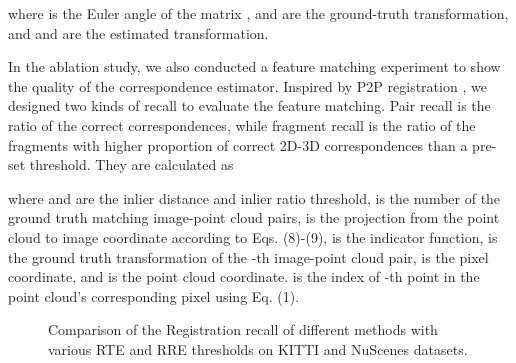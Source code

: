 \documentclass[lettersize,journal]{IEEEtran}
\begin{document}
where  is the Euler angle of the matrix ,  and  are the ground-truth transformation, and  and  are the estimated transformation.



In the ablation study, we also conducted a feature matching experiment to show the quality of the correspondence estimator. Inspired by  P2P registration \cite{RECALL}, we designed two kinds of recall to evaluate the feature matching. Pair recall  is the ratio of the correct correspondences, while fragment recall  is the ratio of the fragments with higher proportion of correct 2D-3D correspondences than a pre-set threshold. They are calculated as



where  and  are the inlier distance and inlier ratio threshold,  is the number of the ground truth matching image-point cloud pairs,  is the projection from the point cloud to image coordinate according to Eqs. (8)-(9),  is the indicator function,  is the ground truth transformation of the -th image-point cloud pair,  is the pixel coordinate, and  is the point cloud coordinate.  is the index of -th point in the point cloud's corresponding pixel using Eq. (1).



\begin{figure*}[h]
\centering
{}
\caption{Comparison of the Registration recall of different methods with various RTE and RRE thresholds on KITTI  and NuScenes datasets.}
\label{FIG6}
\end{figure*}
\end{document}
